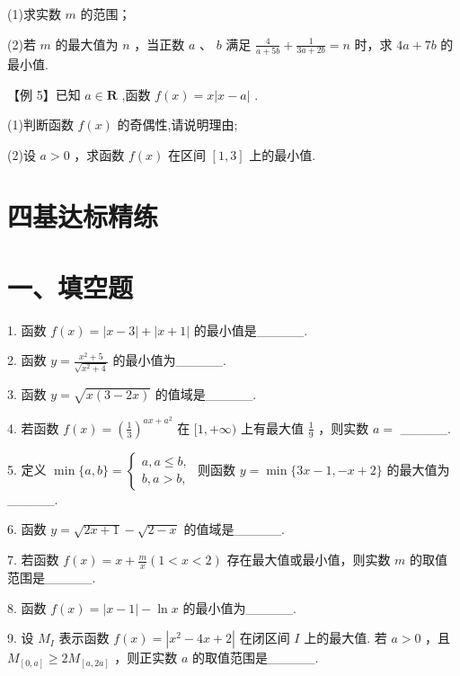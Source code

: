 (1)求实数 $m$ 的范围；

(2)若 $m$ 的最大值为 $n$ ，当正数 $a$ 、 $b$ 满足 $\frac{4}{a + {5b}} + \frac{1}{{3a} + {2b}} = n$ 时，求 ${4a} + {7b}$ 的最小值.

【例 5】已知 $a \in  \mathbf{R}$ ,函数 $f\left( x\right)  = x\left| {x - a}\right|$ .

(1)判断函数 $f\left( x\right)$ 的奇偶性,请说明理由;

(2)设 $a > 0$ ，求函数 $f\left( x\right)$ 在区间 $\left\lbrack  {1,3}\right\rbrack$ 上的最小值.

\section*{四基达标精练}

\section*{一、填空题}

1. 函数 $f\left( x\right)  = \left| {x - 3}\right|  + \left| {x + 1}\right|$ 的最小值是\_\_\_\_\_.

2. 函数 $y = \frac{{x}^{2} + 5}{\sqrt{{x}^{2} + 4}}$ 的最小值为\_\_\_\_\_.

3. 函数 $y = \sqrt{x\left( {3 - {2x}}\right) }$ 的值域是\_\_\_\_\_.

4. 若函数 $f\left( x\right)  = {\left( \frac{1}{3}\right) }^{{ax} + {a}^{2}}$ 在 $\lbrack 1, + \infty )$ 上有最大值 $\frac{1}{9}$ ，则实数 $a =$ \_\_\_\_\_.

5. 定义 $\min \{ a,b\}  = \left\{  \begin{array}{l} a,a \leq  b, \\  b,a > b, \end{array}\right.$ 则函数 $y = \min \{ {3x} - 1, - x + 2\}$ 的最大值为\_\_\_\_\_.

6. 函数 $y = \sqrt{{2x} + 1} - \sqrt{2 - x}$ 的值域是\_\_\_\_\_.

7. 若函数 $f\left( x\right)  = x + \frac{m}{x}\left( {1 < x < 2}\right)$ 存在最大值或最小值，则实数 $m$ 的取值范围是\_\_\_\_\_.

8. 函数 $f\left( x\right)  = \left| {x - 1}\right|  - \ln x$ 的最小值为\_\_\_\_\_.

9. 设 ${M}_{I}$ 表示函数 $f\left( x\right)  = \left| {{x}^{2} - {4x} + 2}\right|$ 在闭区间 $I$ 上的最大值. 若 $a > 0$ ，且 ${M}_{\left\lbrack  0,a\right\rbrack  } \geq  2{M}_{\left\lbrack  a,2a\right\rbrack  }$ ，则正实数 $a$ 的取值范围是\_\_\_\_\_.

